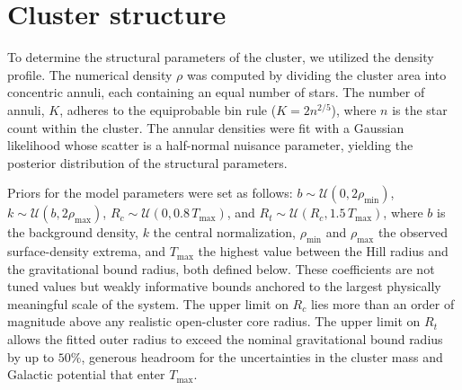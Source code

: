 \documentclass{aa}
\begin{document}
\section{Cluster structure}\label{subsec:structural}
To determine the structural parameters of the cluster, we utilized the \citet{1962AJ.....67..471K} density profile. The numerical density $\rho$ was computed by dividing the cluster area into concentric annuli, each containing an equal number of stars. The number of annuli, $K$, adheres to the equiprobable bin rule ($K = 2n^{2/5}$), where $n$ is the star count within the cluster. The annular densities were fit with a Gaussian likelihood whose scatter is a half-normal nuisance parameter, yielding the posterior distribution of the structural parameters.

Priors for the model parameters were set as follows: $b \sim \mathcal{U}(0, 2\rho_{\mathrm{min}})$, $k \sim \mathcal{U}(b, 2\rho_{\mathrm{max}})$, $R_c \sim \mathcal{U}(0, 0.8\,T_{\mathrm{max}})$, and $R_t \sim \mathcal{U}(R_c, 1.5\,T_{\mathrm{max}})$, where $b$ is the background density, $k$ the central normalization, $\rho_{\mathrm{min}}$ and $\rho_{\mathrm{max}}$ the observed surface-density extrema, and $T_{\mathrm{max}}$ the highest value between the Hill radius and the gravitational bound radius, both defined below. These coefficients are not tuned values but weakly informative bounds anchored to the largest physically meaningful scale of the system. The upper limit on $R_c$ lies more than an order of magnitude above any realistic open-cluster core radius. The upper limit on $R_t$ allows the fitted outer radius to exceed the nominal gravitational bound radius by up to $50\%$, generous headroom for the uncertainties in the cluster mass and Galactic potential that enter $T_{\mathrm{max}}$.
\end{document}
